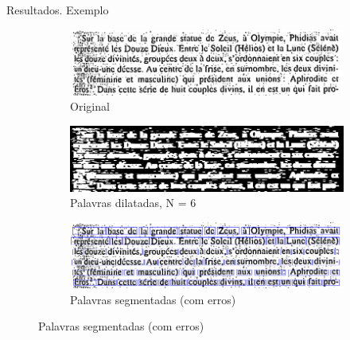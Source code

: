 \documentclass{beamer}
\begin{document}
\begin{frame}[allowframebreaks]{Resultados. Exemplo}
\framebreak

\begin{figure}
    \centering
    \begin{subfigure}[]{0.6\textwidth}
        \centering
        \includegraphics[width=\textwidth]{images/ruido.png}
        \caption{Original}
    \end{subfigure}
    \begin{subfigure}[]{0.6\textwidth}
        \centering
        \includegraphics[width=\textwidth]{images/ruido_words_dilated.png}
        \caption{Palavras dilatadas, N = 6}
    \end{subfigure}
    \begin{subfigure}[]{0.6\textwidth}
        \centering
        \includegraphics[width=\textwidth]{images/ruido_words_6_1.png}
        \caption{Palavras segmentadas (com erros)}
    \end{subfigure}
\end{figure}

\framebreak


\end{frame}
\end{document}
